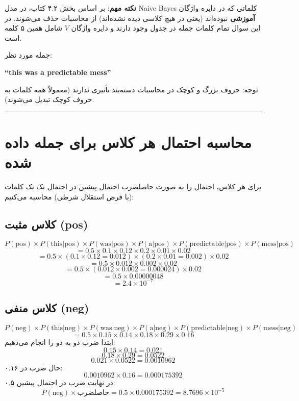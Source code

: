 \documentclass[11pt,a4paper]{article}
\newcommand{\en}[1]{\textenglish{#1}}
\newcommand{\separator}{\vspace{1em}\noindent\rule{\linewidth}{0.4pt}\vspace{1em}}
\begin{document}
\textbf{نکته مهم}: بر اساس بخش ۴.۲ کتاب، در مدل \en{Naive Bayes} کلماتی که در دایره واژگان \textbf{آموزشی} نبوده‌اند (یعنی در هیچ کلاسی دیده نشده‌اند) از محاسبات حذف می‌شوند. در این سوال تمام کلمات جمله در جدول وجود دارند و دایره واژگان $V$ شامل همین ۵ کلمه است.

جمله مورد نظر:
\begin{center}
\textbf{\en{``this was a predictable mess''}}
\end{center}

توجه: حروف بزرگ و کوچک در محاسبات دسته‌بند تأثیری ندارند (معمولاً همه کلمات به حروف کوچک تبدیل می‌شوند).

\separator
\section{محاسبه احتمال هر کلاس برای جمله داده شده}
برای هر کلاس، احتمال را به صورت حاصلضرب احتمال پیشین در احتمال تک تک کلمات (با فرض استقلال شرطی) محاسبه می‌کنیم:

\subsection*{کلاس مثبت (\en{pos})}
\[
P(\text{pos}) \times P(\text{this}|\text{pos}) \times P(\text{was}|\text{pos}) \times P(\text{a}|\text{pos}) \times P(\text{predictable}|\text{pos}) \times P(\text{mess}|\text{pos})
\]
\[
= 0.5 \times 0.1 \times 0.12 \times 0.2 \times 0.01 \times 0.02
\]
\[
= 0.5 \times (0.1 \times 0.12 = 0.012) \times (0.2 \times 0.01 = 0.002) \times 0.02
\]
\[
= 0.5 \times 0.012 \times 0.002 \times 0.02
\]
\[
= 0.5 \times (0.012 \times 0.002 = 0.000024) \times 0.02
\]
\[
= 0.5 \times 0.00000048
\]
\[
= 2.4 \times 10^{-7}
\]

\subsection*{کلاس منفی (\en{neg})}
\[
P(\text{neg}) \times P(\text{this}|\text{neg}) \times P(\text{was}|\text{neg}) \times P(\text{a}|\text{neg}) \times P(\text{predictable}|\text{neg}) \times P(\text{mess}|\text{neg})
\]
\[
= 0.5 \times 0.15 \times 0.14 \times 0.18 \times 0.29 \times 0.16
\]
ابتدا ضرب دو به دو را انجام می‌دهیم:
\[
0.15 \times 0.14 = 0.021
\]
\[
0.18 \times 0.29 = 0.0522
\]
\[
0.021 \times 0.0522 = 0.0010962
\]
حال ضرب در \en{۰.۱۶}:
\[
0.0010962 \times 0.16 = 0.000175392
\]
در نهایت ضرب در احتمال پیشین \en{۰.۵}:
\[
P(\text{neg}) \times \text{حاصلضرب} = 0.5 \times 0.000175392 = 8.7696 \times 10^{-5}
\]
\end{document}
